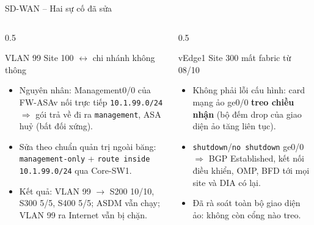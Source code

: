 \documentclass[aspectratio=169, 10pt]{beamer}
\begin{document}
\begin{frame}{SD-WAN -- Hai sự cố đã sửa}
    \begin{columns}[T]
        \begin{column}{0.5\textwidth}
            \begin{block}{VLAN 99 Site 100 $\leftrightarrow$ chi nhánh không thông}
                \small
                \begin{itemize}
                    \item Nguyên nhân: Management0/0 của FW-ASAv nối trực tiếp \texttt{10.1.99.0/24}
                          $\Rightarrow$ gói trả về đi ra \texttt{management}, ASA huỷ (bất đối xứng).
                    \item Sửa theo chuẩn quản trị ngoài băng: \texttt{management-only}
                          + \texttt{route inside 10.1.99.0/24} qua Core-SW1.
                    \item Kết quả: VLAN 99 $\rightarrow$ S200 10/10, S300 5/5, S400 5/5; ASDM vẫn chạy;
                          VLAN 99 ra Internet vẫn bị chặn.
                \end{itemize}
            \end{block}
        \end{column}
        \begin{column}{0.5\textwidth}
            \begin{block}{vEdge1 Site 300 mất fabric từ 08/10}
                \small
                \begin{itemize}
                    \item Không phải lỗi cấu hình: card mạng ảo ge0/0 \textbf{treo chiều nhận}
                          (bộ đếm drop của giao diện ảo tăng liên tục).
                    \item \texttt{shutdown}/\texttt{no shutdown} ge0/0 $\Rightarrow$ BGP Established,
                          kết nối điều khiển, OMP, BFD tới mọi site và DIA có lại.
                    \item Đã rà soát toàn bộ giao diện ảo: không còn cổng nào treo.
                \end{itemize}
            \end{block}
        \end{column}
    \end{columns}
\end{frame}
\end{document}
